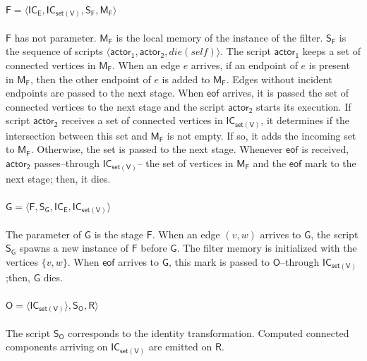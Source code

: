 \documentclass[preprint]{elsarticle}
\newcommand{\owcc}{\mathsf{O}}
\newcommand{\fwcc}{\mathsf{F}}
\newcommand{\gwcc}{\mathsf{G}}
\newcommand{\ice}{\mathsf{IC_E}}
\newcommand{\csofv}{\mathsf{IC_{set(V)}}}
\newcommand{\sgen}{\mathsf{S_G}}
\newcommand{\sfilter}{\mathsf{S_F}}
\newcommand{\sout}{\mathsf{S_O}}
\newcommand{\wccout}{\mathsf{R}}
\newcommand{\fmem}{\mathsf{M_F}}
\newcommand{\eof}{\mathsf{eof}}
\newcommand{\Act}{\mathsf{actor_1}}
\newcommand{\Actt}{\mathsf{actor_2}}
\begin{document}
\paragraph {$\fwcc =\langle \ice, \csofv, \sfilter, \fmem \rangle$} $\fwcc$ has not parameter. $\fmem$ is the local memory of the instance of the filter. $\sfilter$ is the sequence of scripts $\langle \Act,\Actt, die(self)\rangle$. The script $\Act$ keeps a set of connected vertices in $\fmem$. When an edge $e$ arrives, if an endpoint of $e$ is present in $\fmem$, then the other endpoint of $e$ is added to $\fmem$.  Edges without incident endpoints are passed to the next stage. When $\eof$ arrives, it is passed the set of connected vertices to the next stage and the script $\Actt$ starts its execution.  If script $\Actt$ receives a set of connected vertices in $\csofv$, it determines if the intersection between this set and $\fmem$ is not empty. If so, it adds the incoming set to $\fmem$. Otherwise, the set is passed to the next stage.  Whenever $\eof$ is received, $\Actt$ passes--through $\csofv$-- the set of vertices in $\fmem$ and the $\eof$ mark to the next stage; then, it dies.
%

\paragraph{$\gwcc= \langle \fwcc, \sgen, \ice,\csofv  \rangle$} The parameter of $\gwcc$ is the stage  $\fwcc$. When an edge $(v,w)$ arrives to $\gwcc$, the script $\sgen$ spawns a new instance of $\fwcc$ before $\gwcc$. The filter memory is initialized with the vertices $\{v,w\}$. When $\eof$ arrives to $\gwcc$, this mark is passed to $\owcc$--through $\csofv$;then, $\gwcc$ dies. 
\paragraph{$\owcc = \langle \csofv \rangle, \sout, \wccout \rangle$} The script $\sout$ corresponds to the identity transformation.  Computed connected components arriving on  $\csofv$ are emitted on $\wccout$.


\end{document}

